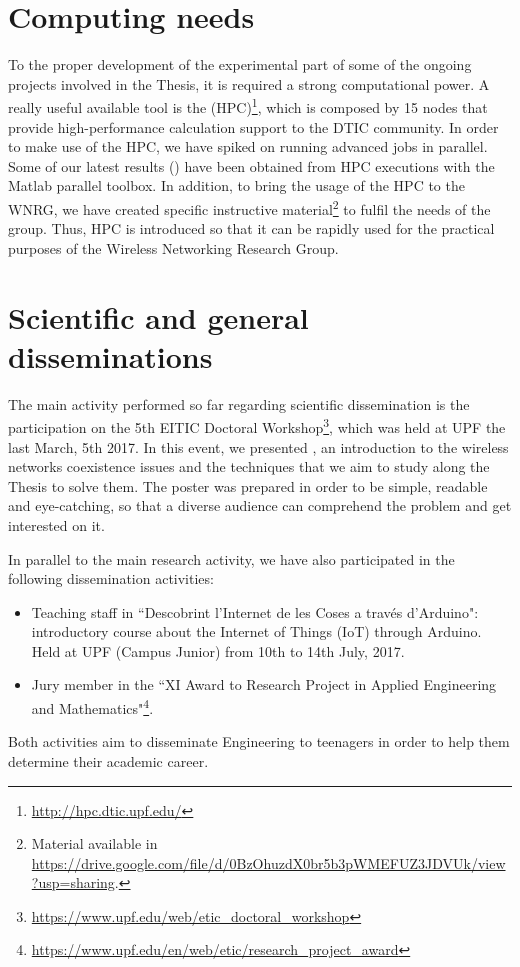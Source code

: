 \documentclass[12pt, a4paper,twoside]{article}
\begin{document}
	\section{Computing needs}
	\label{section:computing}		
	To the proper development of the experimental part of some of the ongoing projects involved in the Thesis, it is required a strong computational power. A really useful available tool is the (HPC)\footnote{\url{http://hpc.dtic.upf.edu/}}, which is composed by 15 nodes that provide high-performance calculation support to the DTIC community. In order to make use of the HPC, we have spiked on running advanced jobs in parallel. Some of our latest results (\cite{wilhelmi2017implications}) have been obtained from HPC executions with the Matlab parallel toolbox. In addition, to bring the usage of the HPC to the WNRG, we have created specific instructive material\footnote{Material available in \url{https://drive.google.com/file/d/0BzOhuzdX0br5b3pWMEFUZ3JDVUk/view?usp=sharing}.} to fulfil the needs of the group. Thus, HPC is introduced so that it can be rapidly used for the practical purposes of the Wireless Networking Research Group.	
		
	\section{Scientific and general disseminations}
	\label{section:dissemination}			
	The main activity performed so far regarding scientific dissemination is the participation on the 5th EITIC Doctoral Workshop\footnote{\url{https://www.upf.edu/web/etic_doctoral_workshop}}, which was held at UPF the last March, 5th 2017. In this event, we presented \cite{wilhelmi2017improving}, an introduction to the wireless networks coexistence issues and the techniques that we aim to study along the Thesis to solve them. The poster was prepared in order to be simple, readable and eye-catching, so that a diverse audience can comprehend the problem and get interested on it.
	
	In parallel to the main research activity, we have also participated in the following dissemination activities:
	\begin{itemize}
		\item Teaching staff in ``Descobrint l'Internet de les Coses a través d'Arduino": introductory course about the Internet of Things (IoT) through Arduino. Held at UPF (Campus Junior) from 10th to 14th July, 2017.
		\item Jury member in the ``XI Award to Research Project in Applied Engineering and Mathematics"\footnote{\url{https://www.upf.edu/en/web/etic/research_project_award}}.
	\end{itemize}
	Both activities aim to disseminate Engineering to teenagers in order to help them determine their academic career.
	
\end{document}
